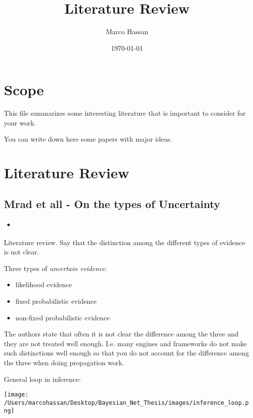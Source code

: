 \documentclass[a4paper]{article}
\author{Marco Hassan}
\date{\today}
\title{Literature Review}
\begin{document}
\maketitle
\tableofcontents

\setlength\parindent{0pt}
\newpage

\section{Scope}
\label{sec:org9b655b0}

This file summarizes some interesting literature that is important
to consider for your work.

You can write down here some papers with major ideas.


\section{Literature Review}
\label{sec:org69d442e}

\subsection{Mrad et all - On the types of Uncertainty}
\label{sec:orgc4a519e}
\begin{itemize}
\item \cite{Mrad_2015}
\end{itemize}

Literature review. Say that the distinction among the different
types of evidence is not clear.

Three types of \emph{uncertain evidence}:

\begin{itemize}
\item likelihood evidence
\item fixed probabilistic evidence
\item non-fixed probabilistic evidence
\end{itemize}

The authors state that often it is not clear the difference among
the three and they are not treated well enough. I.e. many engines
and frameworks do not make such distinctions well enough so that
you do not account for the difference among the three when doing
propagation work.

General loop in inference:

\begin{center}
\texttt{[image: /Users/marcohassan/Desktop/Bayesian\_Net\_Thesis/images/inference\_loop.png]}
\end{center}
\end{document}
